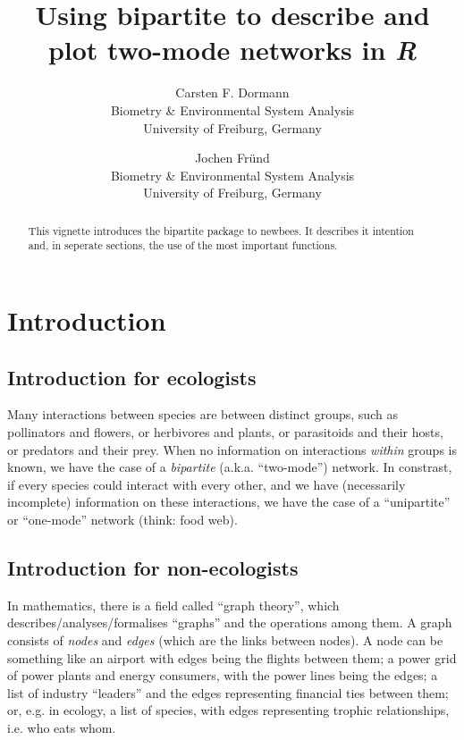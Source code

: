 \documentclass[a4paper, 11pt]{article}
\newcommand{\proglang}[1]{\textsl{#1}}
\begin{document}
\title{Using bipartite to describe and plot two-mode networks in \proglang{R}}

\author{Carsten F. Dormann\\Biometry \& Environmental System Analysis\\University of Freiburg, Germany
\and Jochen Fründ\\Biometry \& Environmental System Analysis\\University of Freiburg, Germany}


\maketitle


 



\begin{abstract}
\noindent This vignette introduces the bipartite package to newbees. It describes it intention and, in seperate sections, the use of the most important functions.
\end{abstract}

\tableofcontents


\section{Introduction}
\subsection{Introduction for ecologists}
Many interactions between species are between distinct groups, such as pollinators and flowers, or herbivores and plants, or parasitoids and their hosts, or predators and their prey. When no information on interactions \emph{within} groups is known, we have the case of a \emph{bipartite} (a.k.a. ``two-mode'') network. In constrast, if every species could interact with every other, and we have (necessarily incomplete) information on these interactions, we have the case of a ``unipartite'' or ``one-mode'' network (think: food web). 

\subsection{Introduction for non-ecologists}
In mathematics, there is a field called ``graph theory'', which describes/analyses/formalises ``graphs'' and the operations among them. A graph consists of \emph{nodes} and \emph{edges} (which are the links between nodes). A node can be something like an airport with edges being the flights between them; a power grid of power plants and energy consumers, with the power lines being the edges; a list of industry ``leaders'' and the edges representing financial ties between them; or, e.g. in ecology, a list of species, with edges representing trophic relationships, i.e. who eats whom.
\end{document}

